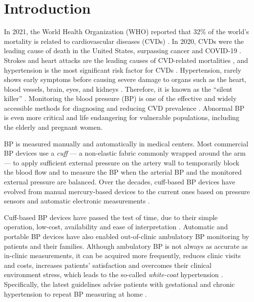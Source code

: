 \documentclass[journal,article,moreauthors]{Definitions/mdpi}
\begin{document}
\section{Introduction}\label{sec:introduction}
In 2021, the World Health Organization (WHO) reported that 32\% of the world’s mortality is related to cardiovascular diseases (CVDs) \citep{who}. In 2020, CVDs were the leading cause of death in the United States, surpassing cancer and COVID-19 \citep{ahmad2021leading}. Strokes and heart attacks are the leading causes of CVD-related mortalities \citep{who,LeonardiBee2002, Lawes2004}, and hypertension is the most significant risk factor for CVDs \citep{Vasan2001, Zhou2017, Guyenet2006}. Hypertension, rarely shows early symptoms before causing severe damage to organs such as the heart, blood vessels, brain, eyes, and kidneys \citep{Brenner1988}. Therefore, it is known as the ``silent killer'' \citep{mukkamala2015toward, kalehoff2020story}. Monitoring the blood pressure (BP) is one of the effective and widely accessible methods for diagnosing and reducing CVD prevalence \citep{rastegar2020non}. Abnormal BP is even more critical and life endangering for vulnerable populations, including the elderly and pregnant women.

BP is measured manually and automatically in medical centers. Most commercial BP devices use a \textit{cuff} --- a non-elastic fabric commonly wrapped around the arm --- to apply sufficient external pressure on the artery wall to temporarily block the blood flow and to measure the BP when the arterial BP and the monitored external pressure are balanced. Over the decades, cuff-based BP devices have evolved from manual mercury-based devices to the current ones based on pressure sensors and automatic electronic measurements \citep{Tholl2004}. 

Cuff-based BP devices have passed the test of time, due to their simple operation, low-cost, availability and ease of interpretation \citep{worldtechnical}. Automatic and portable BP devices have also enabled out-of-clinic ambulatory BP monitoring by patients and their families. Although ambulatory BP is not always as accurate as in-clinic measurements, it can be acquired more frequently, reduces clinic visits and costs, increases patients' satisfaction and overcomes their clinical environment stress, which leads to the so-called \textit{white-coat} hypertension \citep{van2019validation, Pickering2006}. Specifically, the latest guidelines advise patients with gestational and chronic hypertension to repeat BP measuring at home \citep{van2019validation}. 
\end{document}
